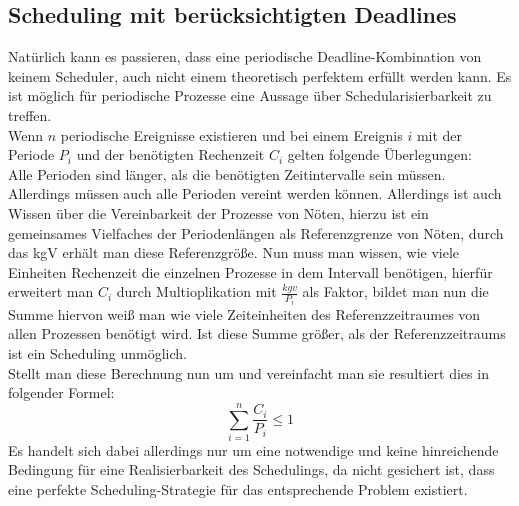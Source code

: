 \subsection{Scheduling mit berücksichtigten Deadlines} 
Natürlich kann es passieren, dass eine periodische Deadline-Kombination von keinem Scheduler, auch nicht 
einem theoretisch perfektem erfüllt werden kann. Es ist möglich für periodische Prozesse eine Aussage über 
Schedularisierbarkeit zu treffen. \\
Wenn \(n\) periodische Ereignisse existieren und bei einem Ereignis \(i\) mit der Periode \(P_i\) und der 
benötigten Rechenzeit \(C_i\) gelten folgende Überlegungen: \\
Alle Perioden sind länger, als die benötigten Zeitintervalle sein müssen. Allerdings müssen auch alle 
Perioden vereint werden können. Allerdings ist auch Wissen über die Vereinbarkeit der Prozesse von Nöten, 
hierzu ist ein gemeinsames Vielfaches der Periodenlängen als Referenzgrenze von Nöten, durch das kgV erhält 
man diese Referenzgröße. Nun muss man wissen, wie viele Einheiten Rechenzeit die einzelnen Prozesse in dem 
Intervall benötigen, hierfür erweitert man \(C_i\) durch Multioplikation mit \(\frac{kgv}{P_i}\) als 
Faktor, bildet man nun die Summe hiervon weiß man wie viele Zeiteinheiten des Referenzzeitraumes von allen 
Prozessen benötigt wird. Ist diese Summe größer, als der Referenzzeitraums ist ein Scheduling unmöglich. \\
Stellt man diese Berechnung nun um und vereinfacht man sie resultiert dies in folgender Formel:
\[\sum\limits_{i=1}^{n}\frac{C_i}{P_i} \leq 1\] 
Es handelt sich dabei allerdings nur um eine notwendige und keine hinreichende Bedingung für eine 
Realisierbarkeit des Schedulings, da nicht gesichert ist, dass eine perfekte Scheduling-Strategie für das 
entsprechende Problem existiert.
\\
